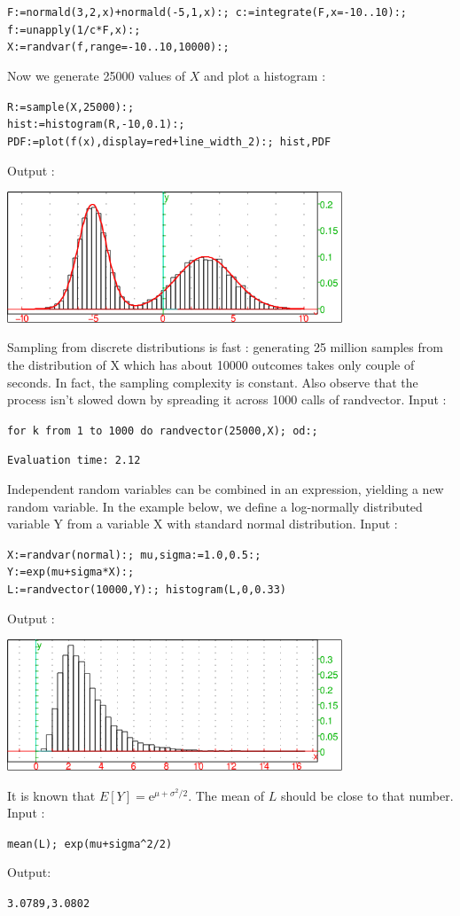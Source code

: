 \documentclass[a4paper,11pt]{book}
\begin{document}
\begin{center}
  \tt F:=normald(3,2,x)+normald(-5,1,x):; c:=integrate(F,x=-10..10):;\\
  f:=unapply(1/c*F,x):;\\
  X:=randvar(f,range=-10..10,10000):;
\end{center}
Now we generate 25000 values of $X$ and plot a histogram :
\begin{center}
  \tt R:=sample(X,25000):;\\
  hist:=histogram(R,-10,0.1):;\\
  PDF:=plot(f(x),display=red+line\_width\_2):;
  hist,PDF
\end{center}
Output :
\begin{center}
  \includegraphics[width=0.75\textwidth]{random_hist2.png}
\end{center}
Sampling from discrete distributions is fast : generating 25 million samples from the distribution of X which
has about 10000 outcomes takes only couple of seconds. In fact, the sampling complexity is constant.
Also observe that the process isn't slowed down by spreading it across 1000 calls of randvector. Input :
\begin{center}
  \tt for k from 1 to 1000 do randvector(25000,X); od:;
\end{center}
{\tt Evaluation time: 2.12}

Independent random variables can be combined in an expression, yielding a new random variable.
In the example below, we define a log-normally distributed variable Y from a variable X with standard
normal distribution. Input :
\begin{center}
  \tt X:=randvar(normal):; mu,sigma:=1.0,0.5:;\\Y:=exp(mu+sigma*X):;\\L:=randvector(10000,Y):; histogram(L,0,0.33)
\end{center}
Output :
\begin{center}
  \includegraphics[width=0.75\textwidth]{random_hist3.png}
\end{center}
It is known that $E[Y]=\mathrm{e}^{\mu+\sigma^2/2}$. The mean of $L$ should be close to that number. Input :
\begin{center}
  \tt mean(L); exp(mu+sigma\verb|^|2/2)
\end{center}
Output:
\begin{center}
  \tt 3.0789,3.0802
\end{center}
\end{document}
